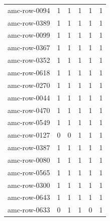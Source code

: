 \begin{tabular}{llllll}
amc-row-0094 & 1 & 1 & 1 & 1 & 1 \\
amc-row-0389 & 1 & 1 & 1 & 1 & 1 \\
amc-row-0099 & 1 & 1 & 1 & 1 & 1 \\
amc-row-0367 & 1 & 1 & 1 & 1 & 1 \\
amc-row-0352 & 1 & 1 & 1 & 1 & 1 \\
amc-row-0618 & 1 & 1 & 1 & 1 & 1 \\
amc-row-0270 & 1 & 1 & 1 & 1 & 1 \\
amc-row-0044 & 1 & 1 & 1 & 1 & 1 \\
amc-row-0470 & 1 & 1 & 1 & 1 & 1 \\
amc-row-0549 & 1 & 1 & 1 & 1 & 1 \\
amc-row-0127 & 0 & 0 & 1 & 1 & 1 \\
amc-row-0387 & 1 & 1 & 1 & 1 & 1 \\
amc-row-0080 & 1 & 1 & 1 & 1 & 1 \\
amc-row-0565 & 1 & 1 & 1 & 1 & 1 \\
amc-row-0300 & 1 & 1 & 1 & 1 & 1 \\
amc-row-0643 & 1 & 1 & 1 & 1 & 1 \\
amc-row-0633 & 0 & 1 & 1 & 0 & 1 \\
\hline
\end{tabular}
